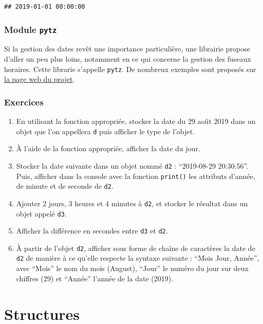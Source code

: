 \documentclass[12pt,]{book}
\providecommand{\tightlist}{%
  \setlength{\itemsep}{0pt}\setlength{\parskip}{0pt}}
\numberwithin{equation}{section}
\numberwithin{countremarque}{section}
\newcounter{exercices}[section]
\let\BeginKnitrBlock\begin \let\EndKnitrBlock\end
\begin{document}
\begin{lstlisting}
## 2019-01-01 00:00:00
\end{lstlisting}

\subsection{\texorpdfstring{Module
\texttt{pytz}}{Module pytz}}\label{module-pytz}

Si la gestion des dates revêt une importance particulière, une librairie
propose d'aller un peu plus loins, notamment en ce qui concerne la
gestion des fuseaux horaires. Cette librarie s'appelle \texttt{pytz}. De
nombreux exemples sont proposés sur
\href{https://pypi.org/project/pytz/}{la page web du projet}.

\subsection{Exercices}\label{exercices}

\BeginKnitrBlock{exframe}
\begin{enumerate}
\def\labelenumi{\arabic{enumi}.}
\tightlist
\item
  En utilisant la fonction appropriée, stocker la date du 29 août 2019
  dans un objet que l'on appellera \texttt{d} puis afficher le type de
  l'objet.
\item
  À l'aide de la fonction appropriée, afficher la date du jour.
\item
  Stocker la date suivante dans un objet nommé \texttt{d2} :
  ``2019-08-29 20:30:56''. Puis, afficher dans la console avec la
  fonction \texttt{print()} les attributs d'année, de minute et de
  seconde de \texttt{d2}.
\item
  Ajouter 2 jours, 3 heures et 4 minutes à \texttt{d2}, et stocker le
  résultat dans un objet appelé \texttt{d3}.
\item
  Afficher la différence en secondes entre \texttt{d3} et \texttt{d2}.
\item
  À partir de l'objet \texttt{d2}, afficher sous forme de chaîne de
  caractères la date de \texttt{d2} de manière à ce qu'elle respecte la
  syntaxe suivante : ``Mois Jour, Année'', avec ``Mois'' le nom du mois
  (August), ``Jour'' le numéro du jour sur deux chiffres (29) et
  ``Année'' l'année de la date (2019).
\end{enumerate}
\EndKnitrBlock{exframe}

\chapter{Structures}\label{structures}
\end{document}
